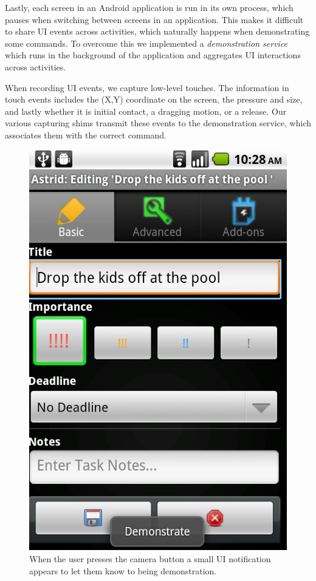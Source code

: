 \documentclass[letterpaper]{article}
\begin{document}
Lastly, each screen in an Android application is run in its own process, which pauses when switching between
screens in an application. This makes it difficult to share UI events across activities, which naturally
happens when demonstrating some commands. To overcome this we implemented a \emph{demonstration service} which runs in the background
of the application and aggregates UI interactions across activities.

When recording UI events, we capture low-level touches. The information in touch events includes the (X,Y) coordinate
on the screen, the pressure and size, and lastly whether it is initial contact, a dragging motion, or a release.
Our various capturing shims transmit these events to the demonstration service, which associates them with the
correct command. 

\begin{figure}[t]
\begin{center}
\includegraphics[scale=0.3]{fig/screenshot-cropped.png}
\end{center}
\caption{When the user presses the camera button a small UI notification appears to let them know to being demonstration.}
\label{fig:interface}
\end{figure}
\end{document}
